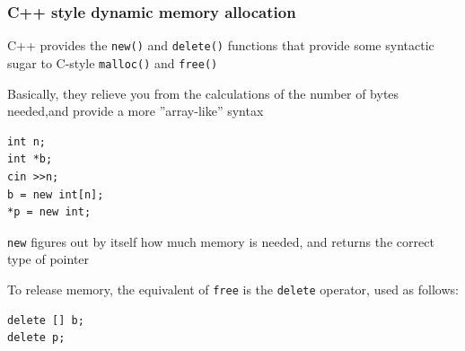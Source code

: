 \documentclass{beamer}
\begin{document}
\begin{frame}[fragile]
\frametitle{C++ style dynamic memory allocation}
C++ provides the \verb|new()| and \verb|delete()| functions
 that provide some syntactic sugar to C-style \verb|malloc()| and
\verb|free()|

\medskip

Basically, they relieve you from the calculations 
of the number of bytes needed,and provide a 
more ''array-like'' syntax

\begin{block}

\begin{scriptsize}

\begin{verbatim}
int n;
int *b;
cin >>n;
b = new int[n];
*p = new int;
\end{verbatim}

\end{scriptsize}

\end{block}

\texttt{new} figures out
by itself how much memory is needed, 
and returns the correct type of pointer

\medskip

To release memory, the equivalent of \verb|free| is 
the \verb|delete| operator, used as follows:

\begin{block}

\begin{scriptsize}

\begin{verbatim}
delete [] b;
delete p;
\end{verbatim}

\end{scriptsize}

\end{block}

\end{frame}
\end{document}
